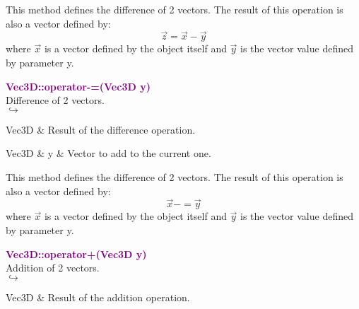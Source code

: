 This method defines the difference of 2 vectors.
The result of this operation is also a vector defined by:
\begin{equation*}
\overrightarrow{z} = \overrightarrow{x} - \overrightarrow{y}
\end{equation*}
where $\overrightarrow{x}$ is a vector defined by the object itself and $\overrightarrow{y}$ is the vector value defined by parameter y.

\textcolor{purple}{\textbf{Vec3D::operator-=(Vec3D y)}}\label{Vec3D::operator-=(Vec3D y)}\\
Difference of 2 vectors.\\ \hspace*{5mm}$\hookrightarrow$
\vspace*{-2em}\begin{tcolorbox}[grow to left by=-1cm, width=\textwidth-1cm,myArgs,tabularx={l|R}]
Vec3D & Result of the difference operation.
\end{tcolorbox}

\begin{tcolorbox}[width=\textwidth,myArgs,tabularx={ll|R}]
Vec3D & y & Vector to add to the current one.
\end{tcolorbox}

This method defines the difference of 2 vectors.
The result of this operation is also a vector defined by:
\begin{equation*}
\overrightarrow{x} -= \overrightarrow{y}
\end{equation*}
where $\overrightarrow{x}$ is a vector defined by the object itself and $\overrightarrow{y}$ is the vector value defined by parameter y.

\textcolor{purple}{\textbf{Vec3D::operator+(Vec3D y)}}\label{Vec3D::operator+(Vec3D y)}\\
Addition of 2 vectors.\\ \hspace*{5mm}$\hookrightarrow$
\vspace*{-2em}\begin{tcolorbox}[grow to left by=-1cm, width=\textwidth-1cm,myArgs,tabularx={l|R}]
Vec3D & Result of the addition operation.
\end{tcolorbox}

